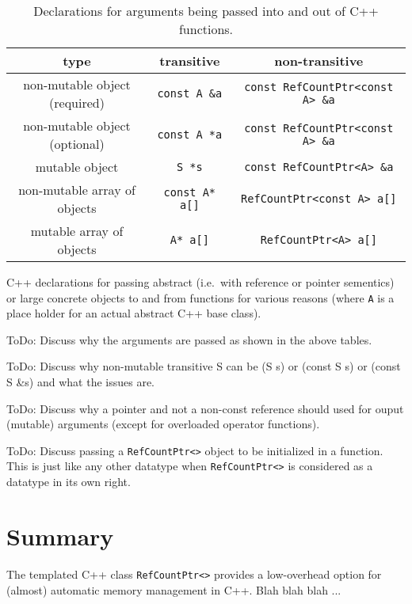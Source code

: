 \begin{table}
%
\begin{minipage}{\textwidth}
\begin{tabular}{|c|c|c|}
\hline
type
& transitive
& non-transitive \\
\hline
non-mutable object (required)
& \texttt{const A \&a}
& \texttt{const RefCountPtr<const A> \&a} \\
\hline
non-mutable object (optional)
& \texttt{const A *a}
& \texttt{const RefCountPtr<const A> \&a} \\
\hline
mutable object
& \texttt{S *s}
& \texttt{const RefCountPtr<A> \&a} \\
\hline
non-mutable array of objects
& \texttt{const A* a[]}
& \texttt{RefCountPtr<const A> a[]} \\
\hline
mutable array of objects
& \texttt{A* a[]}
& \texttt{RefCountPtr<A> a[]} \\
\hline
\end{tabular}
\begin{center}
C++ declarations for passing abstract (i.e.~with reference or pointer
sementics) or large concrete objects to and from functions for various
reasons (where \texttt{A} is a place holder for an actual abstract C++
base class).
\end{center}
\end{minipage}
%
\caption{\label{rcp:tbl:fnc-decl}Declarations for arguments being
passed into and out of C++ functions.}
%
\end{table}

ToDo: Discuss why the arguments are passed as shown in the above
tables.

ToDo: Discuss why non-mutable transitive S can be (S s) or (const S s)
or (const S \&s) and what the issues are.

ToDo: Discuss why a pointer and not a non-const reference should used
for ouput (mutable) arguments (except for overloaded operator
functions).

ToDo: Discuss passing a \texttt{RefCountPtr<>} object to be
initialized in a function.  This is just like any other datatype when
\texttt{RefCountPtr<>} is considered as a datatype in its own right.

%
\section{Summary}
%

The templated C++ class \texttt{RefCountPtr<>} provides a low-overhead
option for (almost) automatic memory management in C++.  Blah blah
blah ...
